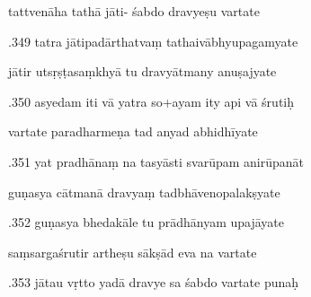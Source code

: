 \documentclass[article,12pt,a4paper]{memoir}%
\newcounter{parCount}
\begin{document}
	  
	  \pstart \leavevmode%
	tattvenāha tathā jāti- śabdo dravyeṣu vartate 
	{}
	\pend%
      

	  
	  \pstart {}.349 tatra jātipadārthatvaṃ   tathaivābhyupagamyate 
	{}
	\pend%
      

	  
	  \pstart \leavevmode%
	jātir utsṛṣṭasaṃkhyā tu dravyātmany anuṣajyate 
	{}
	\pend%
      

	  
	  \pstart {}.350 asyedam iti vā yatra so+ayam ity api vā śrutiḥ 
	{}
	\pend%
      

	  
	  \pstart \leavevmode%
	vartate paradharmeṇa tad anyad abhidhīyate 
	{}
	\pend%
      

	  
	  \pstart {}.351 yat pradhānaṃ na tasyāsti svarūpam anirūpanāt 
	{}
	\pend%
      

	  
	  \pstart \leavevmode%
	guṇasya cātmanā dravyaṃ tadbhāvenopalakṣyate 
	{}
	\pend%
      

	  
	  \pstart {}.352 guṇasya bhedakāle tu prādhānyam upajāyate 
	{}
	\pend%
      

	  
	  \pstart \leavevmode%
	saṃsargaśrutir artheṣu sākṣād eva na vartate 
	{}
	\pend%
      

	  
	  \pstart {}.353 jātau vṛtto yadā dravye sa śabdo vartate punaḥ 
	{}
	\pend%
      
\end{document}
